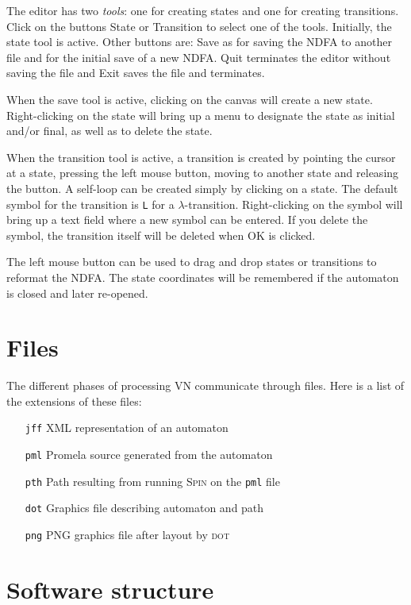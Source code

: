 \documentclass[11pt]{article}
\newcommand{\vn}{\textsc{VN}}
\newcommand{\dt}{\textsc{dot}}
\newcommand{\spn}{\textsc{Spin}}
\newcommand{\p}[1]{\texttt{#1}}
\newcommand{\bu}[1]{\textsf{#1}}
\begin{document}
The editor has two \emph{tools}: one for creating states and one for
creating transitions. Click on the buttons \bu{State} or \bu{Transition}
to select one of the tools. Initially, the state tool is active. Other
buttons are: \bu{Save as} for saving the NDFA to another file and for
the initial save of a new NDFA. \bu{Quit} terminates the editor without
saving the file and \bu{Exit} saves the file and terminates.

When the save tool is active, clicking on the canvas will create a new
state. Right-clicking on the state will bring up a menu to designate the
state as initial and/or final, as well as to delete the state.

When the transition tool is active, a transition is created by pointing
the cursor at a state, pressing the left mouse button, moving to another
state and releasing the button. A self-loop can be created simply by
clicking on a state. The default symbol for the transition is \p{L} for
a $\lambda$-transition. Right-clicking on the symbol will bring up a
text field where a new symbol can be entered. If you delete the symbol,
the transition itself will be deleted when \bu{OK} is clicked.

The left mouse button can be used to drag and drop states or transitions
to reformat the NDFA. The state coordinates will be remembered if the
automaton is closed and later re-opened.

\section{Files}
The different phases of processing \vn{} communicate through files. Here is a
list of the extensions of these files:
\begin{itemize}
  \item[\p{jff}] XML representation of an automaton
  \item[\p{pml}] Promela source generated from the automaton
  \item[\p{pth}] Path resulting from running \spn{} on the \p{pml} file
  \item[\p{dot}] Graphics file describing automaton and path
  \item[\p{png}] \textsc{PNG} graphics file after layout by \dt{}
\end{itemize}

\section{Software structure}
\end{document}
